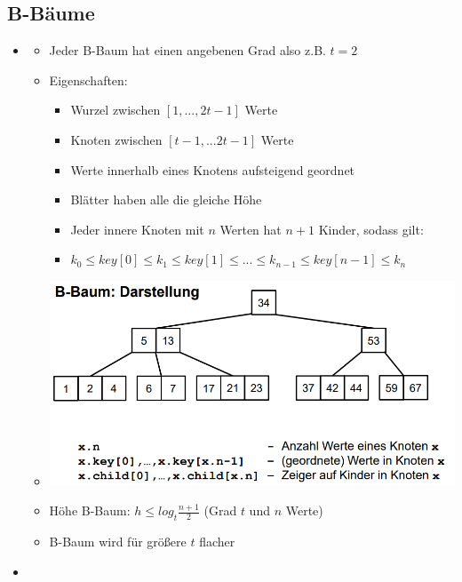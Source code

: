 \documentclass[
    12pt,
    a4paper,
    ngerman,
    color=3b,%
    marginpar=false,
    colorback=false,
    leqno,
]{tudaexercise}
\begin{document}
    \subsection{B-Bäume}\label{B-Baeume}
    \begin{itemize}
        \item {}
            \begin{itemize}
                \item Jeder B-Baum hat einen angebenen Grad also z.B. $t=2$
                \item Eigenschaften:
                    \begin{itemize}
                        \item Wurzel zwischen $[1,...,2t-1]$ Werte
                        \item Knoten zwischen $[t-1,...2t-1]$ Werte
                        \item Werte innerhalb eines Knotens aufsteigend geordnet
                        \item Blätter haben alle die gleiche Höhe
                        \item Jeder innere Knoten mit $n$ Werten hat $n+1$ Kinder, sodass gilt:
                        \item[] $k_0 \leq key[0] \leq k_1 \leq key[1] \leq ... \leq k_{n-1} \leq key[n-1] \leq k_n$
                    \end{itemize}
                \item[] \includegraphics[width=15cm]{pictures/bbaum.PNG}
                \item Höhe B-Baum: $h \leq log_t \frac{n+1}{2}$ (Grad $t$ und $n$ Werte)
                \item B-Baum wird für größere $t$ flacher
            \end{itemize}
        \clearpage
        \item {}

\end{itemize}
\end{document}
